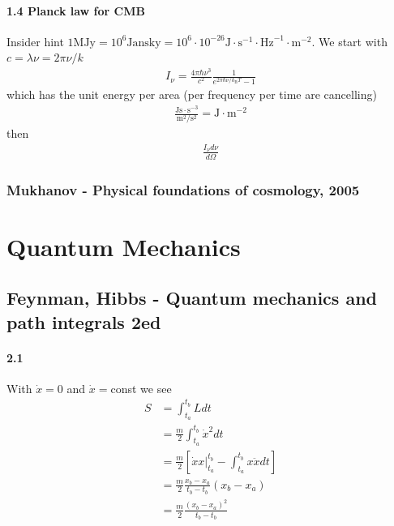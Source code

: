 \documentclass[10pt,a4paper]{book}
\theoremstyle{definition}
\begin{document}
\subsubsection{1.4 Planck law for CMB}
Insider hint $1\text{MJy} =10^6\text{Jansky}=10^6\cdot10^{-26}\text{J}\cdot\text{s}^{-1}\cdot\text{Hz}^{-1}\cdot\text{m}^{-2}$. We start with $c=\lambda\nu=2\pi\nu/k$
\begin{align}
I_\nu=\frac{4\pi\hbar\nu^3}{c^2}\frac{1}{e^{2\pi\hbar\nu/k_\text{B}T}-1}
\end{align}
which has the unit energy per area (per frequency per time are cancelling)
\begin{align}
\frac{\text{Js}\cdot \text{s}^{-3}}{\text{m}^2/\text{s}^2}=\text{J}\cdot\text{m}^{-2}
\end{align}
then
\begin{align}
\frac{I_\nu d\nu}{d\Omega}
\end{align}

\subsection{{\sc Mukhanov} - Physical foundations of cosmology, 2005}

\chapter{Quantum Mechanics}
\section{{\sc Feynman, Hibbs} - Quantum mechanics and path integrals 2ed}
\subsubsection{2.1}
With $\dot x=0$ and $\dot x=$const we see
\begin{align}
    S&=\int_{t_a}^{t_b}L dt\\
    &=\frac{m}{2}\int_{t_a}^{t_b}\dot x^2 dt\\
    &=\frac{m}{2}\left[\left.\dot x x\right|_{t_a}^{t_b}-\int_{t_a}^{t_b} x\ddot xdt\right]\\
    &=\frac{m}{2}\frac{x_b-x_a}{t_b-t_b}(x_b-x_a)\\
     &=\frac{m}{2}\frac{(x_b-x_a)^2}{t_b-t_b}
\end{align}
\end{document}
